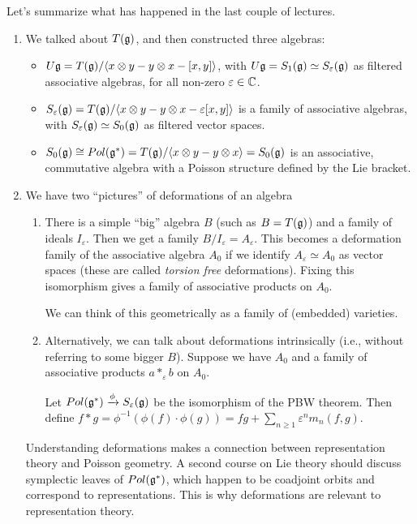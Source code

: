  \setcounter{lecture}{9}

 \newcommand{\diagramsize}{1.25em}

 Let's summarize what has happened in the last couple of lectures.
 \begin{enumerate}
 \item We talked about $T(\mathfrak{g})$, and then constructed three algebras:
 \begin{itemize}
   \item $U\mathfrak{g} =  T(\mathfrak{g})/\langle x\otimes y-y\otimes x-[x,y]\rangle$, with $U\mathfrak{g}=S_1(\mathfrak{g})
     \simeq S_\varepsilon (\mathfrak{g})$ as filtered associative algebras, for all non-zero
     $\varepsilon \in \mathbb{C}$.

   \item $S_\varepsilon (\mathfrak{g}) = T(\mathfrak{g})/\langle x\otimes y-y\otimes
      x-\varepsilon[x,y]\rangle$ is a family of associative algebras, with $S_\varepsilon
      (\mathfrak{g}) \simeq S_0(\mathfrak{g})$ as filtered vector spaces.

   \item $S_0(\mathfrak{g})\cong Pol(\mathfrak{g}^*) = T(\mathfrak{g})/\langle x\otimes y-y\otimes x\rangle = S_0(\mathfrak{g})$
      is an associative, commutative algebra with a Poisson structure defined by the Lie
      bracket.
 \end{itemize}

 \item We have two ``pictures'' of deformations of an algebra
    \begin{enumerate}
    \item There is a simple ``big'' algebra $B$ (such as $B=T(\mathfrak{g})$) and a family of
    ideals $I_\varepsilon$. Then we get a family $B/I_\varepsilon=A_\varepsilon$. This
    becomes a deformation family of the associative algebra $A_0$ if we identify
    $A_\varepsilon \simeq A_0$ as vector spaces (these are called \emph{torsion free}
    deformations). Fixing this isomorphism gives a family of associative products on
    $A_0$.

    We can think of this geometrically as a family of (embedded) varieties.
    \item Alternatively, we can talk about deformations intrinsically (i.e., without referring to some bigger $B$).
    Suppose we have $A_0$ and a family of associative products $a\ast_\varepsilon  b$
    on $A_0$.
    \begin{example}
      Let $Pol(\mathfrak{g}^*) \xrightarrow{\phi} S_\varepsilon (\mathfrak{g})$ be the isomorphism of the PBW theorem. Then
      define \( f\ast g = \phi^{-1} (\phi(f)\cdot \phi(g)) = fg + \sum_{n\ge 1}
      \varepsilon^n m_n(f,g)\).
    \end{example}
    \end{enumerate}
    Understanding deformations makes a connection between representation theory and
    Poisson geometry. A second course on Lie theory should discuss symplectic leaves
    of $Pol(\mathfrak{g}^*)$, which happen to be coadjoint orbits and correspond to
    representations.  This is why deformations are relevant to representation theory.
 \end{enumerate}

